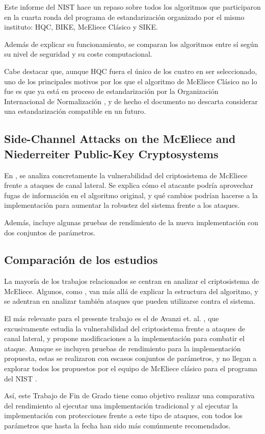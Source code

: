 Este informe del NIST \autocite{NIST8545} hace un repaso sobre todos los algoritmos que participaron en la cuarta ronda del programa de estandarización organizado por el mismo instituto: HQC, BIKE, McEliece Clásico y SIKE.

Además de explicar su funcionamiento, se comparan los algoritmos entre sí según su nivel de seguridad y su coste computacional.

Cabe destacar que, aunque HQC fuera el único de los cuatro en ser seleccionado, uno de los principales motivos por los que el algoritmo de McEliece Clásico no lo fue es que ya está en proceso de estandarización por la Organización Internacional de Normalización \autocite{isoMcEliece}, y de hecho el documento no descarta considerar una estandarización compatible en un futuro.

\subsection{Side-Channel Attacks on the McEliece and Niederreiter Public-Key Cryptosystems}

En \autocite{Avanzi2011}, se analiza concretamente la vulnerabilidad del criptosistema de McEliece frente a ataques de canal lateral. Se explica cómo el atacante podría aprovechar fugas de información en el algoritmo original, y qué cambios podrían hacerse a la implementación para aumentar la robustez del sistema frente a los ataques.

Además, incluye algunas pruebas de rendimiento de la nueva implementación con dos conjuntos de parámetros.

\subsection{Comparación de los estudios}

La mayoría de los trabajos relacionados se centran en analizar el criptosistema de McEliece. Algunos, como \autocite{McEliece2021, implementation}, van más allá de explicar la estructura del algoritmo, y se adentran en analizar también ataques que pueden utilizarse contra el sistema.

El más relevante para el presente trabajo es el de Avanzi et. al. \autocite{Avanzi2011}, que excusivamente estudia la vulnerabilidad del criptosistema frente a ataques de canal lateral, y propone modificaciones a la implementación para combatir el ataque. Aunque se incluyen pruebas de rendimiento para la implementación propuesta, estas se realizaron con escasos conjuntos de parámetros, y no llegan a explorar todos los propuestos por el equipo de McEliece clásico para el programa del NIST \autocite{NIST8545}.

Así, este Trabajo de Fin de Grado tiene como objetivo realizar una comparativa del rendimiento al ejecutar una implementación tradicional y al ejecutar la implementación con protecciones frente a este tipo de ataques, con todos los parámetros que hasta la fecha han sido más comúnmente recomendados.

